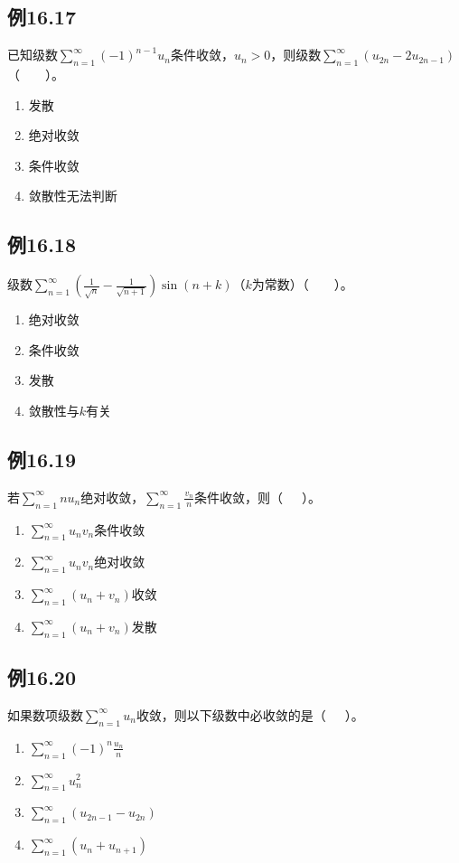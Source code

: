 \documentclass[UTF8]{ctexart}
\theoremstyle{remark}
\begin{document}
\begin{multicols}{2}
	\subsection*{例16.17}
	已知级数\(\sum_{n = 1}^{\infty}(-1)^{n - 1}u_{n}\)条件收敛，\(u_{n}>0\)，则级数\(\sum_{n = 1}^{\infty}(u_{2n}-2u_{2n - 1})\)（~~~~）。
	\begin{enumerate}[label=(\Alph*)]
		\item 发散
		\item 绝对收敛
		\item 条件收敛
		\item 敛散性无法判断
	\end{enumerate}
	
	\subsection*{例16.18}
	级数\(\sum_{n = 1}^{\infty}\left(\frac{1}{\sqrt{n}}-\frac{1}{\sqrt{n + 1}}\right)\sin(n + k)\)（\(k\)为常数）（~~~~）。
	\begin{enumerate}[label=(\Alph*)]
		\item 绝对收敛
		\item 条件收敛
		\item 发散
		\item 敛散性与\(k\)有关
	\end{enumerate}
	
	\subsection*{例16.19}
	若\(\sum_{n = 1}^{\infty}nu_{n}\)绝对收敛，\(\sum_{n = 1}^{\infty}\frac{v_{n}}{n}\)条件收敛，则（~~~）。
	\begin{enumerate}[label=(\Alph*)]
		\item \(\sum_{n = 1}^{\infty}u_{n}v_{n}\)条件收敛
		\item \(\sum_{n = 1}^{\infty}u_{n}v_{n}\)绝对收敛
		\item \(\sum_{n = 1}^{\infty}(u_{n}+v_{n})\)收敛
		\item \(\sum_{n = 1}^{\infty}(u_{n}+v_{n})\)发散
	\end{enumerate}
	
	\subsection*{例16.20}
	如果数项级数\(\sum_{n = 1}^{\infty}u_{n}\)收敛，则以下级数中必收敛的是（~~~）。
	\begin{enumerate}[label=(\Alph*)]
		\item \(\sum_{n = 1}^{\infty}(-1)^{n}\frac{u_{n}}{n}\)
		\item \(\sum_{n = 1}^{\infty}u_{n}^{2}\)
		\item \(\sum_{n = 1}^{\infty}(u_{2n - 1}-u_{2n})\)
		\item \(\sum_{n = 1}^{\infty}(u_{n}+u_{n + 1})\)
	\end{enumerate}
	

\end{multicols}
\end{document}
